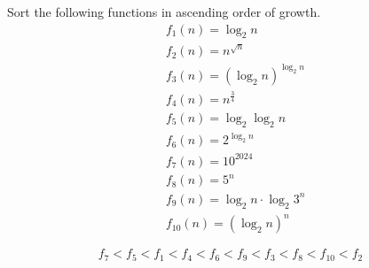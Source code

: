 \problem{}

Sort the following functions in ascending order of growth.
\begin{align}
    &f_1(n)=\log_2{n} \\
    &f_2(n)=n^{\sqrt{n}} \\
    &f_3(n)=(\log_2{n})^{\log_2{n}} \\
    &f_4(n)=n^{\frac{3}{4}}  \\
    &f_5(n)=\log_2{\log_2{n}} \\
    &f_6(n)=2^{\log_2{n}}  \\
    &f_7(n)=10^{2024}  \\
    &f_8(n)=5^n \\
    &f_9(n)=\log_2{n}\cdot\log_2{3^n} \\
    &f_{10}(n)=(\log_2{n})^n
\end{align}

\solution{}


$$f_7<f_5<f_1<f_4<f_6<f_9<f_3<f_8<f_{10}<f_2$$

\newpage